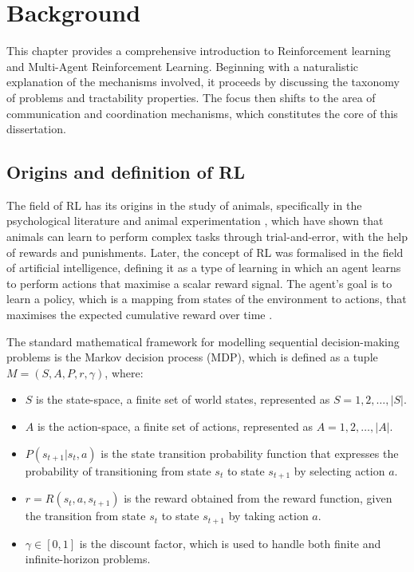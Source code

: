 \documentclass[a4paper,singleside,12pt]{report} %
\begin{document}
\chapter{Background}\label{background}
This chapter provides a comprehensive introduction to Reinforcement learning and Multi-Agent Reinforcement Learning. Beginning with a naturalistic explanation of the mechanisms involved, it proceeds by discussing the taxonomy of problems and tractability properties. The focus then shifts to the area of communication and coordination mechanisms, which constitutes the core of this dissertation.

\section{Origins and definition of RL}\label{origins}

The field of RL has its origins in the study of animals, specifically in the psychological literature \cite{Rao2000ReinforcementLA} and animal experimentation \cite{Rescorla1988behavioral}, which have shown that animals can learn to perform complex tasks through trial-and-error, with the help of rewards and punishments. Later, the concept of RL was formalised in the field of artificial intelligence, defining it as a type of learning in which an agent learns to perform actions that maximise a scalar reward signal. The agent's goal is to learn a policy, which is a mapping from states of the environment to actions, that maximises the expected cumulative reward over time \cite{Rao2000ReinforcementLA}.

The standard mathematical framework for modelling sequential decision-making problems is the Markov decision process (MDP), which is defined as a tuple \(M = (S, A, P, r, \gamma)\), where:

\begin{itemize}
\item
  \(S\) is the state-space, a finite set of world states, represented as \(S = {1, 2, \dots, |S|}\).
\item
  \(A\) is the action-space, a finite set of actions, represented as \(A = {1, 2, \dots, |A|}\).
\item
  \(P(s_{t+1}|s_t, a)\) is the state transition probability function that expresses the probability of transitioning from state \(s_t\) to state \(s_{t+1}\) by selecting action \(a\).
\item
  \(r = R(s_t, a, s_{t+1})\) is the reward obtained from the reward function, given the transition from state \(s_t\) to state \(s_{t+1}\) by taking action
  \(a\).
\item
  \(\gamma \in [0, 1]\) is the discount factor, which is used to handle both finite and infinite-horizon problems.
\end{itemize}
\end{document}
